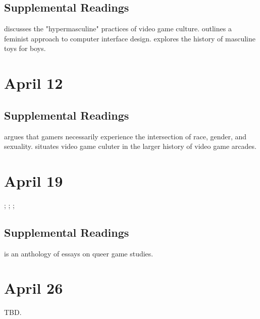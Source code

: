 \documentclass[11pt]{article}
\begin{document}

\subsection{Supplemental Readings}
\label{sec:org4079b1b}

\cite{Salter:2012fa} discusses the "hypermasculine" practices of video game culture.  \cite{Bardzell:2010dv} outlines a feminist approach to computer interface design. \cite{Varney:2002en} explores the history of masculine toys for boys.  

\section{April 12}
\label{sec:orge00144e}


\subsection{Supplemental Readings}
\label{sec:orgb329030}

\cite{Shaw:2015dr} argues that gamers necessarily experience the intersection of race, gender, and sexuality.  \cite{Kocurek:2015cg} situates video game culuter in the larger history of video game arcades.

\section{April 19}
\label{sec:orga889f99}

; ; ; \cite{Gray:2014uj}

\subsection{Supplemental Readings}
\label{sec:org725b302}

\cite{Ruberg:2017ww} is an anthology of essays on queer game studies.

\section{April 26}
\label{sec:org1907822}

TBD.

\newpage

\nocite{*} 
\printbibliography
\end{document}
